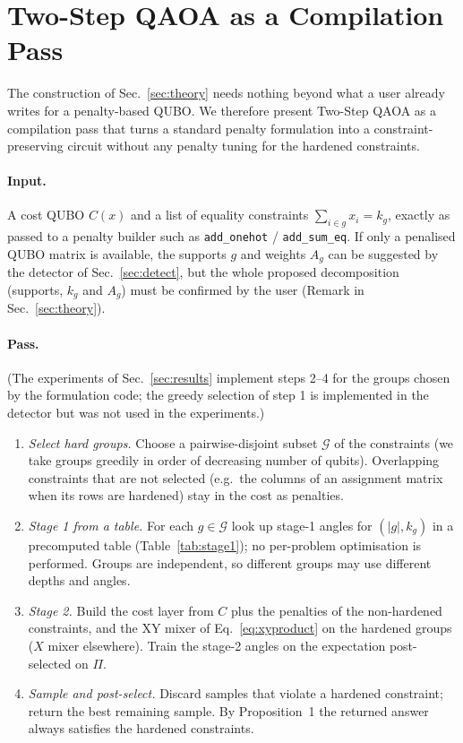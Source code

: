 \section{Two-Step QAOA as a Compilation Pass}
\label{sec:software}

The construction of Sec.~\ref{sec:theory} needs nothing beyond what a user already writes for a
penalty-based QUBO. We therefore present Two-Step QAOA as a compilation pass that turns a
standard penalty formulation into a constraint-preserving circuit without any penalty tuning
for the hardened constraints.

\paragraph{Input.} A cost QUBO $C(x)$ and a list of equality constraints $\sum_{i\in g}x_i=k_g$,
exactly as passed to a penalty builder such as \texttt{add\_onehot} / \texttt{add\_sum\_eq}.
If only a penalised QUBO matrix is available, the supports $g$ and weights $A_g$ can be suggested
by the detector of Sec.~\ref{sec:detect}, but the whole proposed decomposition (supports, $k_g$ and $A_g$) must be confirmed by the user (Remark in Sec.~\ref{sec:theory}).

\paragraph{Pass.} (The experiments of Sec.~\ref{sec:results} implement steps 2--4 for the groups chosen by the
formulation code; the greedy selection of step 1 is implemented in the detector but was not used in the experiments.)
\begin{enumerate}
\item \emph{Select hard groups.} Choose a pairwise-disjoint subset $\mathcal G$ of the constraints
  (we take groups greedily in order of decreasing number of qubits). Overlapping constraints that are not selected
  (e.g.\ the columns of an assignment matrix when its rows are hardened) stay in the cost as penalties.
\item \emph{Stage 1 from a table.} For each $g\in\mathcal G$ look up stage-1 angles for $(|g|,k_g)$
  in a precomputed table (Table~\ref{tab:stage1}); no per-problem optimisation is performed.
  Groups are independent, so different groups may use different depths and angles.
\item \emph{Stage 2.} Build the cost layer from $C$ plus the penalties of the non-hardened constraints,
  and the XY mixer of Eq.~\eqref{eq:xyproduct} on the hardened groups ($X$ mixer elsewhere).
  Train the stage-2 angles on the expectation post-selected on $\Pi$.
\item \emph{Sample and post-select.} Discard samples that violate a hardened constraint; return the best
  remaining sample. By Proposition~1 the returned answer always satisfies the hardened constraints.
\end{enumerate}

